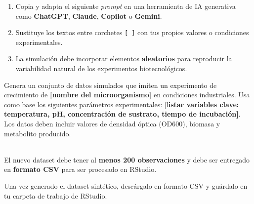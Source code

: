 \documentclass[
  spanish,
  letterpaper,
  DIV=11,
  numbers=noendperiod]{scrreprt}
\begin{document}
\begin{enumerate}
\def\labelenumi{\arabic{enumi}.}
\item
  Copia y adapta el siguiente \emph{prompt} en una herramienta de IA
  generativa como \textbf{ChatGPT}, \textbf{Claude}, \textbf{Copilot} o
  \textbf{Gemini}.
\item
  Sustituye los textos entre corchetes \texttt{{[}\ {]}} con tus propios
  valores o condiciones experimentales.
\item
  La simulación debe incorporar elementos \textbf{aleatorios} para
  reproducir la variabilidad natural de los experimentos
  biotecnológicos.
\end{enumerate}

\begin{tcolorbox}[enhanced jigsaw, colback=white, breakable, toptitle=1mm, toprule=.15mm, colbacktitle=quarto-callout-tip-color!10!white, bottomrule=.15mm, coltitle=black, titlerule=0mm, opacityback=0, leftrule=.75mm, bottomtitle=1mm, colframe=quarto-callout-tip-color-frame, left=2mm, title=\textcolor{quarto-callout-tip-color}{\faLightbulb}\hspace{0.5em}{Primer modelo de Prompt}, rightrule=.15mm, opacitybacktitle=0.6, arc=.35mm]

Genera un conjunto de datos simulados que imiten un experimento de
crecimiento de \textbf{{[}nombre del microorganismo{]}} en condiciones
industriales. Usa como base los siguientes parámetros experimentales:
{[}l\textbf{istar variables clave: temperatura, pH, concentración de
sustrato, tiempo de incubación{]}}. Los datos deben incluir valores de
densidad óptica (OD600), biomasa y metabolito producido.\\
\strut \\
El nuevo dataset debe tener al \textbf{menos 200 observaciones} y debe
ser entregado en \textbf{formato CSV} para ser procesado en RStudio.

Una vez generado el dataset sintético, descárgalo en formato CSV y
guárdalo en tu carpeta de trabajo de RStudio.

\end{tcolorbox}
\end{document}
